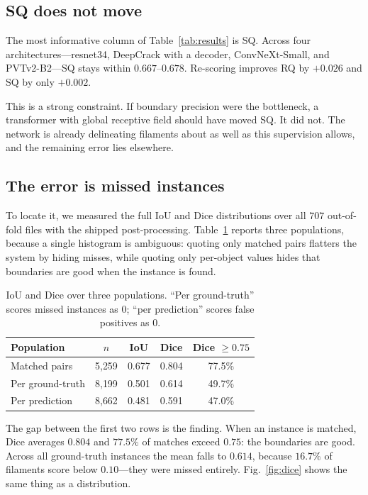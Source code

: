 \documentclass[conference]{IEEEtran}
\begin{document}
\subsection{SQ does not move}

The most informative column of Table~\ref{tab:results} is SQ. Across four
architectures---resnet34, DeepCrack with a decoder, ConvNeXt-Small, and
PVTv2-B2---SQ stays within $0.667$--$0.678$. Re-scoring improves RQ by
$+0.026$ and SQ by only $+0.002$.

This is a strong constraint. If boundary precision were the bottleneck, a
transformer with global receptive field should have moved SQ. It did not. The
network is already delineating filaments about as well as this supervision
allows, and the remaining error lies elsewhere.

\subsection{The error is missed instances}

To locate it, we measured the full IoU and Dice distributions over all $707$
out-of-fold files with the shipped post-processing. Table~\ref{tab:dist} reports
three populations, because a single histogram is ambiguous: quoting only matched
pairs flatters the system by hiding misses, while quoting only per-object values
hides that boundaries are good when the instance is found.

\begin{table}[t]
\centering
\caption{IoU and Dice over three populations. ``Per ground-truth'' scores missed
instances as $0$; ``per prediction'' scores false positives as $0$.}
\label{tab:dist}
\small
\begin{tabular}{@{}lcccc@{}}
\toprule
Population & $n$ & IoU & Dice & Dice $\geq 0.75$ \\
\midrule
Matched pairs      & 5{,}259 & 0.677 & 0.804 & 77.5\% \\
Per ground-truth   & 8{,}199 & 0.501 & 0.614 & 49.7\% \\
Per prediction     & 8{,}662 & 0.481 & 0.591 & 47.0\% \\
\bottomrule
\end{tabular}
\end{table}

The gap between the first two rows is the finding. When an instance is matched,
Dice averages $0.804$ and $77.5\%$ of matches exceed $0.75$: the boundaries are
good. Across all ground-truth instances the mean falls to $0.614$, because
$16.7\%$ of filaments score below $0.10$---they were missed entirely.
Fig.~\ref{fig:dice} shows the same thing as a distribution.
\end{document}
